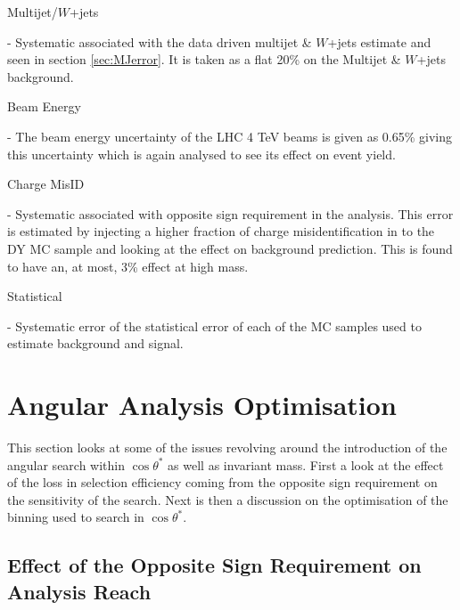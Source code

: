     {\bf\raggedright Multijet/$W$+jets} - Systematic associated with the data driven multijet \& $W$+jets estimate and seen in section \ref{sec:MJerror}. It is taken as a flat 20\% on the Multijet \& $W$+jets background.\\
    {\bf\raggedright Beam Energy} - The beam energy uncertainty of the LHC 4 TeV beams is given as 0.65\% giving this uncertainty which is again analysed to see its effect on event yield. \\
    {\bf\raggedright Charge MisID} - Systematic associated with opposite sign requirement in the analysis. This error is estimated by injecting a higher fraction of charge misidentification in to the DY MC sample and looking at the effect on background prediction. This is found to have an, at most, 3\% effect at high mass. \\
    {\bf\raggedright Statistical} - Systematic error of the statistical error of each of the MC samples used to estimate background and signal. \\






\section{Angular Analysis Optimisation}


This section looks at some of the issues revolving around the introduction of the angular search within $\cos{\theta^{*}}$ as well as invariant mass. First a look at the effect of the loss in selection efficiency coming from the opposite sign requirement on the sensitivity of the search. Next is then a discussion on the optimisation of the binning used to search in $\cos{\theta^{*}}$.

\subsection{Effect of the Opposite Sign Requirement on Analysis Reach}
    \label{sec:oppSign}

